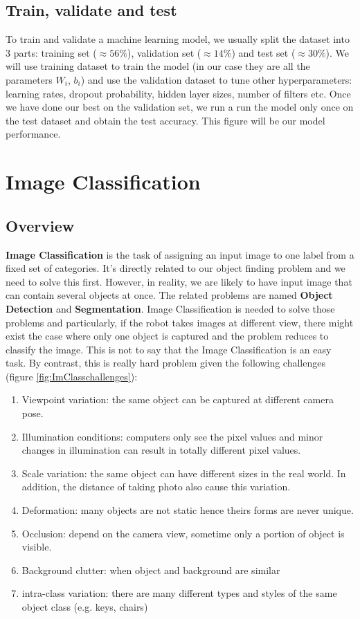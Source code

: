 \subsection{Train, validate and test}
To train and validate a machine learning model, we usually split the dataset into 3 parts: training set ($\approx56\%$), validation set ($\approx14\%$) and test set ($\approx30\%$). We will use training dataset to train the model (in our case they are all the parameters $W_i$, $b_i$) and use the validation dataset to tune other hyperparameters: learning rates, dropout probability, hidden layer sizes, number of filters etc. Once we have done our best on the validation set, we run a run the model only once on the test dataset and obtain the test accuracy. This figure will be our model performance. 

\section{Image Classification}
\subsection{Overview}
\textbf{Image Classification} is the task of assigning an input image to one label from a fixed set of categories. It's directly related to our object finding problem and we need to solve this first. However, in reality, we are likely to have input image that can contain several objects at once. The related problems are named \textbf{Object Detection} and \textbf{Segmentation}. Image Classification is needed to solve those problems and particularly, if the robot takes images at different view, there might exist the case where only one object is captured and the problem reduces to classify the image. This is not to say that the Image Classification is an easy task. By contrast, this is really hard problem given the following challenges (figure \ref{fig:ImClasschallenges}):
\begin{enumerate}
	\item Viewpoint variation: the same object can be captured at different camera pose.
	\item Illumination conditions: computers only see the pixel values and minor changes in illumination can result in totally different pixel values. 
	\item Scale variation: the same object can have different sizes in the real world. In addition, the distance of taking photo also cause this variation.
	\item Deformation: many objects are not static hence theirs forms are never unique.
	\item Occlusion: depend on the camera view, sometime only a portion of object is visible.
	\item Background clutter: when object and background are similar
	\item intra-class variation: there are many different types and styles of the same object class (e.g. keys, chairs)
\end{enumerate}

